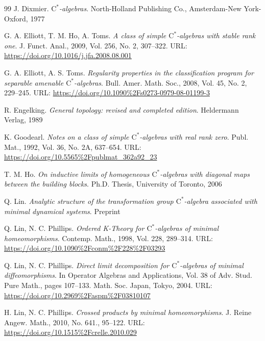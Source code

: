 \documentclass[12pt]{amsart}
\numberwithin{equation}{section}
\theoremstyle{definition}
\theoremstyle{remark}
\begin{document}
\begin{thebibliography}{99}
J. Dixmier. \textit{$\mathrm{C}^*$-algebras}. North-Holland Publishing Co., Amsterdam-New York-Oxford, 1977

 G. A. Elliott, T. M. Ho, A. Toms. \textit{A class of simple $\mathrm{C}^*$-algebras with stable rank one}. J. Funct. Anal., 2009, Vol. 256, No. 2, 307--322. URL: \href{https://doi.org/10.1016/j.jfa.2008.08.001}{https://doi.org/10.1016/j.jfa.2008.08.001}

 G. A. Elliott, A. S. Toms. \textit{Regularity properties in the classification program for separable amenable $\mathrm{C}^{*}$-algebras}. Bull. Amer. Math. Soc., 2008, Vol. 45, No. 2, 229--245. URL: \href{https://doi.org/10.1090\%2Fs0273-0979-08-01199-3}{https://doi.org/10.1090\%2Fs0273-0979-08-01199-3}

 R. Engelking. \textit{General topology: revised and completed edition}. Heldermann Verlag, 1989

 K. Goodearl. \textit{Notes on a class of simple $\mathrm{C^*}$-algebras with real rank zero}. Publ. Mat., 1992, Vol. 36, No. 2A, 637--654. URL: \href{https://doi.org/10.5565\%2Fpublmat_362a92_23}{https://doi.org/10.5565\%2Fpublmat\_362a92\_23}

 T. M. Ho. \textit{On inductive limits of homogeneous $\mathrm{C}^*$-algebras with diagonal maps between the building blocks}. Ph.D. Thesis, University of Toronto, 2006

 Q. Lin. \textit{Analytic structure of the transformation group $\mathrm{C}^*$-algebra associated with minimal dynamical systems}. Preprint

 Q. Lin, N. C. Phillips. \textit{Ordered K-Theory for $\mathrm{C}^*$-algebras of minimal homeomorphisms}. Contemp. Math., 1998, Vol. 228, 289--314. URL: \href{https://doi.org/10.1090\%2Fconm\%2F228\%2F03293}{https://doi.org/10.1090\%2Fconm\%2F228\%2F03293}

 Q. Lin, N. C. Phillips. \textit{Direct limit decomposition for $\mathrm{C}^*$-algebras of minimal diffeomorphisms}. In Operator Algebras and Applications, Vol. 38 of Adv. Stud. Pure Math., pages 107--133. Math. Soc. Japan, Tokyo, 2004. URL: \href{https://doi.org/10.2969\%2Faspm\%2F03810107}{https://doi.org/10.2969\%2Faspm\%2F03810107}

 H. Lin, N. C. Phillips. \textit{Crossed products by minimal homeomorphisms}. J. Reine Angew. Math., 2010, No. 641., 95--122. URL: \href{https://doi.org/10.1515\%2Fcrelle.2010.029}{https://doi.org/10.1515\%2Fcrelle.2010.029}


\end{thebibliography}
\end{document}
